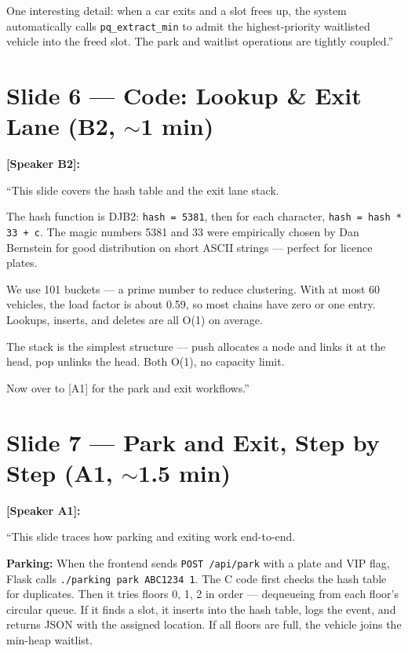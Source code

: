 \documentclass[12pt, a4paper]{article}
\begin{document}
One interesting detail: when a car exits and a slot frees up, the system automatically calls \texttt{pq\_extract\_min} to admit the highest-priority waitlisted vehicle into the freed slot. The park and waitlist operations are tightly coupled.''

\section{Slide 6 --- Code: Lookup \& Exit Lane (B2, $\sim$1 min)}

\textbf{[Speaker B2]:}

``This slide covers the hash table and the exit lane stack.

The hash function is DJB2: \texttt{hash = 5381}, then for each character, \texttt{hash = hash * 33 + c}. The magic numbers 5381 and 33 were empirically chosen by Dan Bernstein for good distribution on short ASCII strings --- perfect for licence plates.

We use 101 buckets --- a prime number to reduce clustering. With at most 60 vehicles, the load factor is about 0.59, so most chains have zero or one entry. Lookups, inserts, and deletes are all O(1) on average.

The stack is the simplest structure --- push allocates a node and links it at the head, pop unlinks the head. Both O(1), no capacity limit.

Now over to [A1] for the park and exit workflows.''

\section{Slide 7 --- Park and Exit, Step by Step (A1, $\sim$1.5 min)}

\textbf{[Speaker A1]:}

``This slide traces how parking and exiting work end-to-end.

\textbf{Parking:} When the frontend sends \texttt{POST /api/park} with a plate and VIP flag, Flask calls \texttt{./parking park ABC1234 1}. The C code first checks the hash table for duplicates. Then it tries floors 0, 1, 2 in order --- dequeueing from each floor's circular queue. If it finds a slot, it inserts into the hash table, logs the event, and returns JSON with the assigned location. If all floors are full, the vehicle joins the min-heap waitlist.
\end{document}
